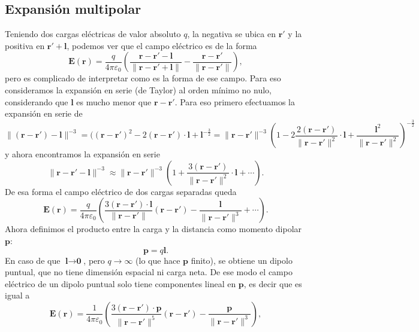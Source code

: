 \documentclass[11pt,a4paper]{article}
\numberwithin{equation}{section}
\begin{document}
\subsection{Expansión multipolar}
\label{sec:e_multipolar}
Teniendo dos cargas eléctricas de valor absoluto $q$, la negativa se ubica en $\textbf{r}'$ y la positiva en $\textbf{r}' + \textbf{l}$, podemos ver que el campo eléctrico es de la forma \[\textbf{E}(\textbf{r}) = \frac{q}{4\pi\varepsilon_0} \left( \frac{\textbf{r} -  \textbf{r}' - \textbf{l}}{\|\textbf{r} - \textbf{r}' + \textbf{l}\|} - \frac{ \textbf{r} - \textbf{r}'}{\| \textbf{r} - \textbf{r}'\|} \right),\] pero es complicado de interpretar como es la forma de ese campo. Para eso consideramos la expansión en serie (de Taylor) al orden mínimo no nulo, considerando que $\textbf{l}$ es mucho menor que $\textbf{r} - \textbf{r}'$. Para eso primero efectuamos la expansión en serie de \[\|(\textbf{r} - \textbf{r}') - \textbf{l}\|^{-3} = ((\textbf{r} - \textbf{r}')^2 - 2 (\textbf{r} - \textbf{r}') \cdot \textbf{l} + \textbf{l}^{-\frac{3}{2}} = \|\textbf{r} - \textbf{r}'\|^{-3} \left(1 - 2 \frac{2(\textbf{r} - \textbf{r}')}{\|\textbf{r} - \textbf{r}'\|^2} \cdot \textbf{l} + \frac{\textbf{l}^2}{\|\textbf{r} - \textbf{r}'\|^2}\right)^{-\frac{3}{2}}\] y  ahora encontramos la expansión en serie \[\|\textbf{r} - \textbf{r}' - \textbf{l}\|^{-3} \approx \|\textbf{r} - \textbf{r}'\|^{-3} \left(1 + \frac{3 (\textbf{r} - \textbf{r}')}{\|\textbf{r} - \textbf{r}'\|^2} \cdot  \textbf{l} + \cdots  \right).\] De esa forma el campo eléctrico de dos cargas separadas queda
\begin{equation}
    \textbf{E}(\textbf{r}) = \frac{q}{4\pi\varepsilon_0} \left(\frac{3 (\textbf{r} - \textbf{r}') \cdot \textbf{l}}{\|\textbf{r} - \textbf{r}'\|} (\textbf{r} - \textbf{r}') - \frac{\textbf{l}}{\|\textbf{r} - \textbf{r}'\|^3} + \cdots \right).
    \label{eq:e_campo_dipolo_real}
\end{equation}
Ahora definimos el producto entre la carga y la distancia como momento dipolar $\textbf{p}$:
\begin{equation}
    \textbf{p} = q\textbf{l}.
    \label{eq:e_dipolo}
\end{equation}
En caso de que $\textbf{l} \to \textbf{0}$, pero $q \to \infty$ (lo que hace $\textbf{p}$ finito), se obtiene un dipolo puntual, que no tiene dimensión espacial ni carga neta. De ese modo el campo eléctrico de un dipolo puntual solo tiene componentes lineal en $\textbf{p}$, es decir que es igual a
\begin{equation}
    \textbf{E}(\textbf{r}) = \frac{1}{4\pi\varepsilon_0} \left(\frac{3 (\textbf{r} - \textbf{r}') \cdot \textbf{p}}{\|\textbf{r} - \textbf{r}'\|^5}(\textbf{r} - \textbf{r}') - \frac{\textbf{p}}{\|\textbf{r} - \textbf{r}'\|^3}\right),
    \label{eq:e_dipolo_puntal}
\end{equation}
\end{document}
